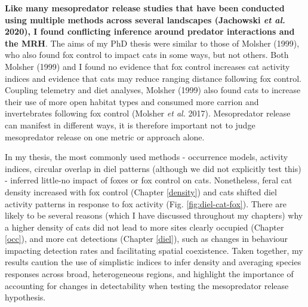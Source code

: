 \documentclass[11pt,a4paper,titlepage,twoside,openright]{style/unimelbthesis}
\begin{document}
\begin{mainmatter}
\textbf{Like many mesopredator release studies that have been conducted using multiple methods across several landscapes (Jachowski \emph{et al.} 2020), I found conflicting inference around predator interactions and the MRH}. The aims of my PhD thesis were similar to those of Molsher (1999), who also found fox control to impact cats in some ways, but not others. Both Molsher (1999) and I found no evidence that fox control increases cat activity indices and evidence that cats may reduce ranging distance following fox control. Coupling telemetry and diet analyses, Molsher (1999) also found cats to increase their use of more open habitat types and consumed more carrion and invertebrates following fox control (Molsher \emph{et al.} 2017). Mesopredator release can manifest in different ways, it is therefore important not to judge mesopredator release on one metric or approach alone.

In my thesis, the most commonly used methods - occurrence models, activity indices, circular overlap in diel patterns (although we did not explicitly test this) - inferred little-no impact of foxes or fox control on cats. Nonetheless, feral cat density increased with fox control (Chapter \ref{density}) and cats shifted diel activity patterns in response to fox activity (Fig. \ref{fig:diel-cat-fox}). There are likely to be several reasons (which I have discussed throughout my chapters) why a higher density of cats did not lead to more sites clearly occupied (Chapter \ref{occ}), and more cat detections (Chapter \ref{diel}), such as changes in behaviour impacting detection rates and facilitating spatial coexistence. Taken together, my results caution the use of simplistic indices to infer density and averaging species responses across broad, heterogeneous regions, and highlight the importance of accounting for changes in detectability when testing the mesopredator release hypothesis.


\end{mainmatter}
\end{document}
